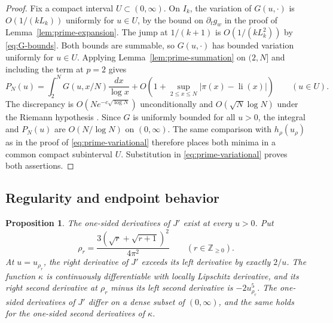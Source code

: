 \documentclass[11pt]{amsart}
\newtheorem{proposition}[theorem]{Proposition}
\theoremstyle{remark}
\DeclareMathOperator{\li}{li}
\newcommand{\Z}{\mathbb Z}
\begin{document}
\begin{proof}
Fix a compact interval \(U\subset(0,\infty)\). On \(I_k\), the variation
of \(G(u,\cdot)\) is \(O(1/(kL_k))\) uniformly for \(u\in U\), by the
bound on \(\partial_t g_w\) in the proof of
Lemma~\ref{lem:prime-expansion}. The jump at \(1/(k+1)\) is
\(O(1/(kL_k^2))\) by \eqref{eq:G-bounds}. Both bounds are summable,
so \(G(u,\cdot)\) has bounded variation uniformly for \(u\in U\).
Applying Lemma~\ref{lem:prime-summation} on \((2,N]\) and including the
term at \(p=2\) gives
\[
 P_N(u)=\int_2^N G(u,x/N)\frac{dx}{\log x}
       +O\!\left(1+\sup_{2\le x\le N}|\pi(x)-\li(x)|\right)
       \qquad(u\in U).
\]
The discrepancy is \(O(Ne^{-c\sqrt{\log N}})\) unconditionally and
\(O(\sqrt N\log N)\) under the Riemann hypothesis
\cite[(6.14) and (13.4)]{montgomery-vaughan}.
Since \(G\) is uniformly bounded for all \(u>0\), the integral
and \(P_N(u)\) are \(O(N/\log N)\) on \((0,\infty)\).
The same comparison with \(h_\rho(u_\rho)\) as in the proof of
\eqref{eq:prime-variational} therefore places both minima in a common
compact subinterval \(U\). Substitution in \eqref{eq:prime-variational}
proves both assertions.
\end{proof}

\subsection{Regularity and endpoint behavior}

\begin{proposition}
\label{prop:kappa-corners}
The one-sided derivatives of \(J'\) exist at every \(u>0\). Put
\[
 \rho_r=\frac{3(\sqrt r+\sqrt{r+1})^2}{4\pi^2}
 \qquad(r\in\Z_{\ge0}).
\]
At \(u=u_{\rho_r}\), the right derivative of \(J'\) exceeds its left
derivative by exactly \(2/u\). The function \(\kappa\) is continuously
differentiable with locally Lipschitz derivative, and its right
second derivative at \(\rho_r\) minus its left second derivative is
\(-2u_{\rho_r}^{5}\). The one-sided derivatives of \(J'\) differ on a
dense subset of \((0,\infty)\), and the same holds for the one-sided
second derivatives of \(\kappa\).
\end{proposition}
\end{document}
